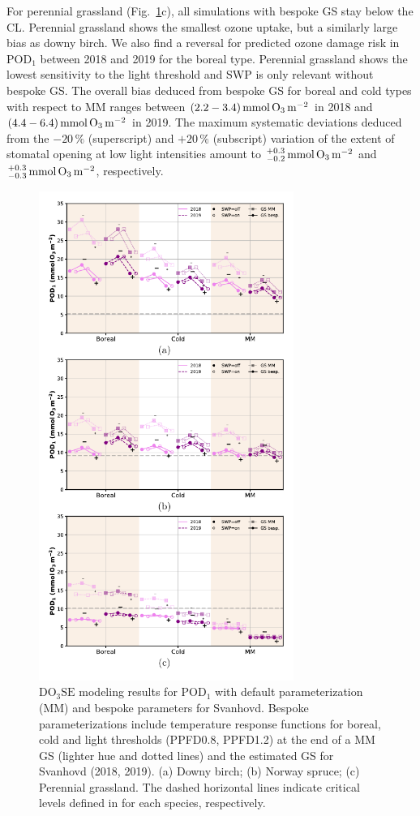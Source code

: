 \documentclass[bg, manuscript]{copernicus}
\begin{document}
For perennial grassland (Fig.~\ref{fig:pody_rel}c), all simulations with bespoke GS stay below the CL. Perennial grassland shows the smallest ozone uptake, but a similarly large bias as downy birch. We also find a reversal for predicted ozone damage risk in $\mathrm{POD_1}$ between 2018 and 2019 for the boreal type. Perennial grassland shows the lowest sensitivity to the light threshold and SWP is only relevant without bespoke GS. The overall bias deduced from bespoke GS for boreal and cold types with respect to MM ranges between $(2.2-3.4)\,\unit{mmol\,\chem{O_3}\,m^{-2}}$ in 2018 and $(4.4-6.4)\,\unit{mmol\,\chem{O_3}\,m^{-2}}$ in 2019. The maximum systematic deviations deduced from the $-20\,\unit{\%}$ (superscript) and $+20\,\unit{\%}$ (subscript) variation of the extent of stomatal opening at low light intensities amount to $^{+0.3}_{-0.2}\,\unit{mmol\,\chem{O_3}\,m^{-2}}$ and $^{+0.3}_{-0.3}\,\unit{mmol\,\chem{O_3}\,m^{-2}}$, respectively.

\begin{figure}[t]
  \includegraphics[width=8.3cm]{fig11}
  \caption{$\mathrm{DO_3SE}$ modeling results for $\mathrm{POD_1}$ with default parameterization (MM) and bespoke parameters for Svanhovd. Bespoke parameterizations include temperature response functions for boreal, cold and light thresholds (PPFD0.8, PPFD1.2) at the end of a MM GS (lighter hue and dotted lines) and the estimated GS for Svanhovd (2018, 2019). (a) Downy birch; (b) Norway spruce; (c) Perennial grassland. The dashed horizontal lines indicate critical levels defined in \citet{ICP:MappingManual2017,ESPR:Hayes2021} for each species, respectively.}
  \label{fig:pody_rel}
\end{figure}
\end{document}
